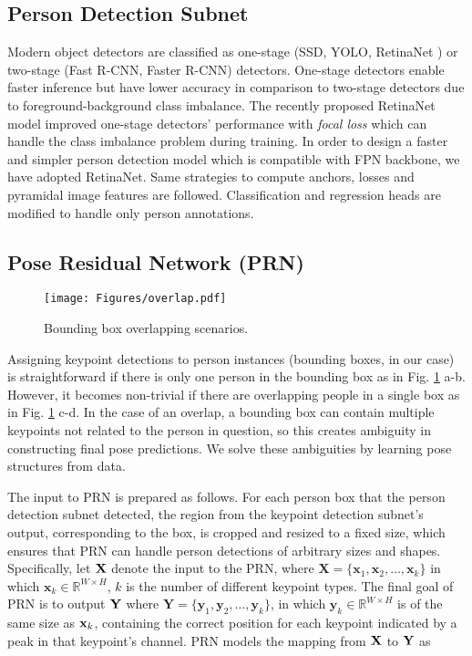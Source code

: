 \documentclass[runningheads]{llncs}
\begin{document}
\subsection{Person Detection Subnet}
Modern object detectors are classified as one-stage (SSD\cite{liu2016ssd}, YOLO\cite{redmon}, RetinaNet \cite{Lin2017}) or two-stage (Fast R-CNN\cite{girshick15fastrcnn}, Faster R-CNN\cite{ren2015faster}) detectors. One-stage detectors enable faster inference but have lower accuracy in comparison to two-stage detectors due to foreground-background class imbalance. The recently proposed RetinaNet \cite{Lin2017} model improved one-stage detectors'   performance with \textit{focal loss} which can handle the class imbalance problem during training. In order to design a faster and simpler person detection model which is compatible with FPN backbone, we have adopted RetinaNet. Same strategies to compute anchors, losses and pyramidal image features are followed. Classification and regression heads are modified to handle only person annotations.     




\subsection{Pose Residual Network (PRN)}
\label{sec:method-prn}


\begin{figure}
\centering
\texttt{[image: Figures/overlap.pdf]}
\caption{Bounding box overlapping scenarios.}
\label{fig:overlap}
\end{figure}


Assigning keypoint detections to person instances (bounding boxes, in our case) is straightforward if there is only one person in the bounding box as in Fig. \ref{fig:overlap} a-b. However, it becomes non-trivial if there are overlapping people in a single box as in Fig. \ref{fig:overlap} c-d. In the case of an overlap, a bounding box can contain multiple keypoints not related to the person in question, so this creates ambiguity in constructing final pose predictions. We solve these ambiguities by learning pose structures from data.


The input to PRN is prepared as follows. For each person box that the person detection subnet detected, the region from the keypoint detection subnet's output, corresponding to the box, is cropped and resized to a fixed size, which ensures that PRN can handle person detections of arbitrary sizes and shapes. Specifically, let $\bf X$ denote the input to the PRN, where $\mathbf{X} = \{\mathbf{x}_1, \mathbf{x}_2, \dots, \mathbf{x}_k\}$ in which $\mathbf{x}_k \in \mathbb{R}^{W \times H}$, $k$ is the number of different keypoint types. The final goal of PRN is to output $\bf Y$ where $\mathbf{Y} = \{\mathbf{y}_1, \mathbf{y}_2, \dots, \mathbf{y}_k\}$, in which $\mathbf{y}_k \in \mathbb{R}^{W \times H}$ is of the same size as ${\bf x}_k$, containing the correct position for each keypoint indicated by a peak in that keypoint’s channel. PRN models the mapping from $\bf X$ to $\bf Y$ as 
\end{document}

